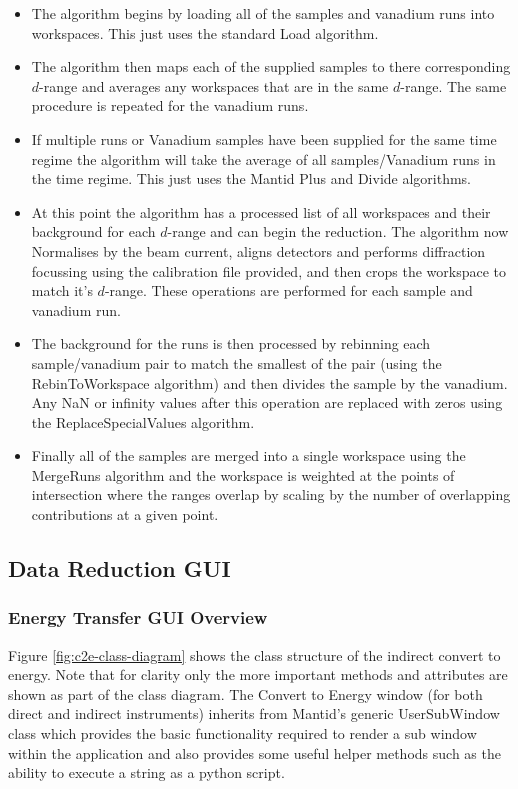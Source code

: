 \documentclass[paper=a4, fontsize=11pt]{scrartcl}	%
\numberwithin{equation}{section}															%
\numberwithin{figure}{section}																%
\numberwithin{table}{section}																%
\begin{document}
\begin{itemize}
\item The algorithm begins by loading all of the samples and vanadium runs into workspaces. This just uses the standard Load algorithm.

\item The algorithm then maps each of the supplied samples to there corresponding $d$-range and averages any workspaces that are in the same $d$-range. The same procedure is repeated for the vanadium runs.

\item If multiple runs or Vanadium samples have been supplied for the same time regime the algorithm will take the average of all samples/Vanadium runs in the time regime. This just uses the Mantid Plus and Divide algorithms. 

\item At this point the algorithm has a processed list of all workspaces and their background for each $d$-range and can begin the reduction. The algorithm now Normalises by the beam current, aligns detectors and performs diffraction focussing using the calibration file provided, and then crops the workspace to match it's $d$-range. These operations are performed for each sample and vanadium run.

\item The background for the runs is then processed by rebinning each sample/vanadium pair to match the smallest of the pair (using the RebinToWorkspace algorithm) and then divides the sample by the vanadium. Any NaN or infinity values after this operation are replaced with zeros using the ReplaceSpecialValues algorithm.

\item Finally all of the samples are merged into a single workspace using the MergeRuns algorithm and the workspace is weighted at the points of intersection where the ranges overlap by scaling by the number of overlapping contributions at a given point.
\end{itemize}

\subsection{Data Reduction GUI}

\subsubsection{Energy Transfer GUI Overview}
\label{subsec:c2e-gui-overview}
Figure \ref{fig:c2e-class-diagram} shows the class structure of the indirect convert to energy. Note that for clarity only the more important methods and attributes are shown as part of the class diagram. The Convert to Energy window (for both direct and indirect instruments) inherits from Mantid's generic UserSubWindow class which provides the basic functionality required to render a sub window within the application and also provides some useful helper methods such as the ability to execute a string as a python script.
\end{document}
